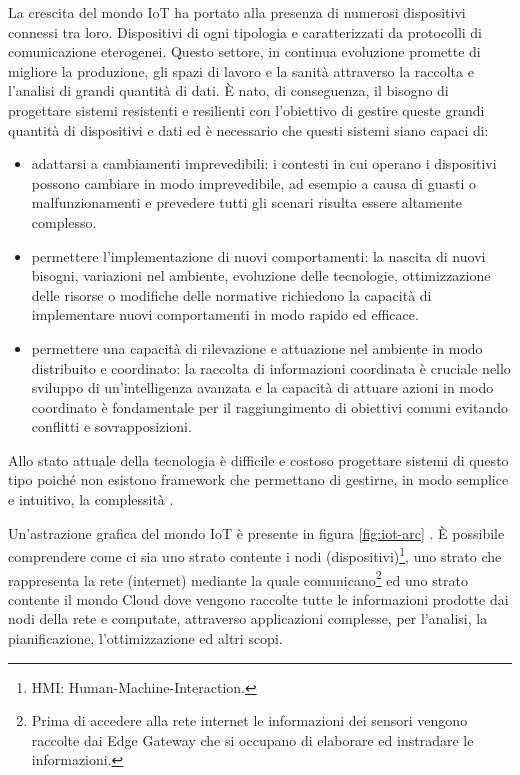 \documentclass[12pt,a4paper,openright,twoside]{book}
\begin{document}
La crescita del mondo \ac{IoT} ha portato alla presenza di numerosi dispositivi connessi tra loro. Dispositivi di ogni tipologia e caratterizzati da protocolli di comunicazione eterogenei. Questo settore, in continua evoluzione promette di migliore la produzione, gli spazi di lavoro e la sanità attraverso la raccolta e l'analisi di grandi quantità di dati. È nato, di conseguenza, il bisogno di progettare sistemi resistenti e resilienti con l'obiettivo di gestire queste grandi quantità di dispositivi e dati ed è necessario che questi sistemi siano capaci di: 
\begin{itemize}
    \item adattarsi a cambiamenti imprevedibili: i contesti in cui operano i dispositivi possono cambiare in modo imprevedibile, ad esempio a causa di guasti o malfunzionamenti e prevedere tutti gli scenari risulta essere altamente complesso. 
    \item permettere l'implementazione di nuovi comportamenti: la nascita di nuovi bisogni, variazioni nel ambiente, evoluzione delle tecnologie, ottimizzazione delle risorse o modifiche delle normative richiedono la capacità di implementare nuovi comportamenti in modo rapido ed efficace. 
    \item permettere una capacità di rilevazione e attuazione nel ambiente in modo distribuito e coordinato: la raccolta di informazioni coordinata è cruciale nello sviluppo di un'intelligenza avanzata e la capacità di attuare azioni in modo coordinato è fondamentale per il raggiungimento di obiettivi comuni evitando conflitti e sovrapposizioni. 
\end{itemize}

Allo stato attuale della tecnologia è difficile e costoso progettare sistemi di questo tipo poiché non esistono framework che permettano di gestirne, in modo semplice e intuitivo, la complessità \cite{Beal2015} \cite{CasadeiPhDThesis}.

Un'astrazione grafica del mondo IoT è presente in figura \ref{fig:iot-arc} \cite{Testa2022}. È possibile comprendere come ci sia uno strato contente i nodi (dispositivi)\footnote{HMI: Human-Machine-Interaction.}, uno strato che rappresenta la rete (internet) mediante la quale comunicano\footnote{Prima di accedere alla rete internet le informazioni dei sensori vengono raccolte dai Edge Gateway che si occupano di elaborare ed instradare le informazioni.} ed uno strato contente il mondo Cloud dove vengono raccolte tutte le informazioni prodotte dai nodi della rete e computate, attraverso applicazioni complesse, per l'analisi, la pianificazione, l'ottimizzazione ed altri scopi.
\end{document}
